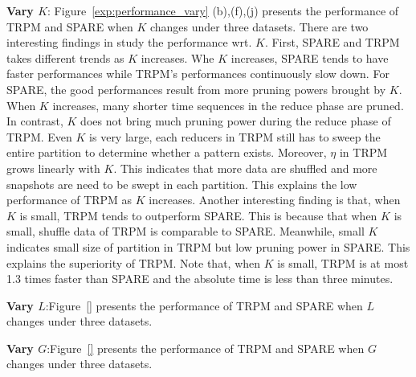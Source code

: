 \textbf{Vary $K$}: Figure~\ref{exp:performance_vary} (b),(f),(j) 
presents the performance of TRPM and SPARE when $K$ changes under three datasets. 
There are two interesting findings in study the performance wrt. $K$. 
First, SPARE and TRPM takes different trends as $K$ increases. 
Whe $K$ increases, SPARE tends to have faster performances 
while TRPM's performances continuously slow down. For SPARE, the 
good performances result from more pruning powers brought
by $K$. When $K$ increases, many shorter time sequences in the reduce phase
are pruned. In contrast, $K$ does not bring much pruning power
during the reduce phase of TRPM. Even $K$ is very large, each reducers in TRPM
still has to sweep the entire partition to determine whether a pattern exists.
Moreover, $\eta$ in TRPM grows linearly with $K$. This indicates that
more data are shuffled and more snapshots are need to
be swept in each partition. This explains the low performance of TRPM as $K$
increases. Another interesting finding is that, when $K$ is small,
TRPM tends to outperform SPARE. This is because that when $K$ is small, shuffle
data of TRPM is comparable to SPARE. Meanwhile, small $K$ indicates small
size of partition in TRPM but low pruning power in SPARE. This explains the
superiority of TRPM. Note that, when $K$ is small, TRPM is at most 1.3 times
faster than SPARE and the absolute time is less than three minutes. 

\textbf{Vary $L$}:Figure~\ref{} presents the performance
of TRPM and SPARE when $L$ changes under three datasets.

\textbf{Vary $G$}:Figure~\ref{} presents the performance
of TRPM and SPARE when $G$ changes under three datasets.


